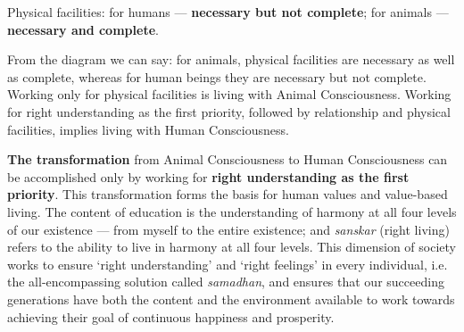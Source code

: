\vspace{4pt}
\begin{center}
\end{center}

Physical facilities: for humans --- \textbf{necessary but not complete}; for
animals --- \textbf{necessary and complete}.

From the diagram we can say: for animals, physical facilities are necessary as
well as complete, whereas for human beings they are necessary but not
complete. Working only for physical facilities is living with Animal
Consciousness. Working for right understanding as the first priority, followed
by relationship and physical facilities, implies living with Human
Consciousness.

\textbf{The transformation} from Animal Consciousness to Human Consciousness
can be accomplished only by working for \textbf{right understanding as the
first priority}. This transformation forms the basis for human values and
value-based living. The content of education is the understanding of harmony
at all four levels of our existence --- from myself to the entire existence;
and \emph{sanskar} (right living) refers to the ability to live in harmony at
all four levels. This dimension of society works to ensure `right
understanding' and `right feelings' in every individual, i.e. the
all-encompassing solution called \emph{samadhan}, and ensures that our
succeeding generations have both the content and the environment available to
work towards achieving their goal of continuous happiness and prosperity.

